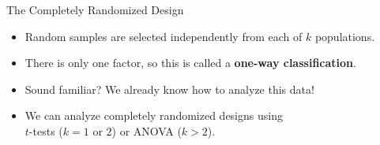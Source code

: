 \begin{frame}{The Completely Randomized Design}
    \begin{itemize}
        \item Random samples are selected independently from each of $k$ populations.
        \item There is only one factor, so this is called a \textbf{one-way classification}.
        \item Sound familiar? We already know how to analyze this data!
        \item We can analyze completely randomized designs using \\ $t$-tests ($k=1$ or $2$) or ANOVA ($k > 2$).
    \end{itemize}
\end{frame}
